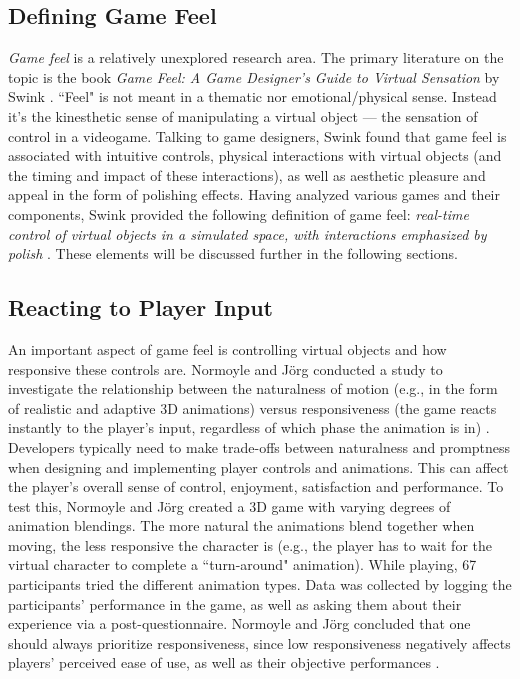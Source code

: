 \subsection{Defining Game Feel}
\textit{Game feel} is a relatively unexplored research area. The primary literature on the topic is the book \textit{Game Feel: A Game Designer's Guide to Virtual Sensation} by Swink \cite{swink}. ``Feel" is not meant in a thematic nor emotional/physical sense. Instead it's the kinesthetic sense of manipulating a virtual object --- the sensation of control in a videogame. Talking to game designers, Swink found that game feel is associated with intuitive controls, physical interactions with virtual objects (and the timing and impact of these interactions), as well as aesthetic pleasure and appeal in the form of polishing effects. Having analyzed various games and their components, Swink provided the following definition of game feel: \textit{real-time control of virtual objects in a simulated space, with interactions emphasized by polish} \cite{swink}. These elements will be discussed further in the following sections.

\subsection{Reacting to Player Input}
An important aspect of game feel is controlling virtual objects and how responsive these controls are. Normoyle and J\"{o}rg conducted a study to investigate the relationship between the naturalness of motion (e.g., in the form of realistic and adaptive 3D animations) versus responsiveness (the game reacts instantly to the player's input, regardless of which phase the animation is in) \cite{normoyle_trade-offs_2014}. Developers typically need to make trade-offs between naturalness and promptness when designing and implementing player controls and animations. This can affect the player's overall sense of control, enjoyment, satisfaction and performance. To test this, Normoyle and J\"{o}rg  created a 3D game with varying degrees of animation blendings. The more natural the animations blend together when moving, the less responsive the character is (e.g., the player has to wait for the virtual character to complete a ``turn-around" animation). While playing, 67 participants tried the different animation types.  Data was collected by logging the participants' performance in the game, as well as asking them about their experience via a post-questionnaire. Normoyle and J\"{o}rg concluded that one should always prioritize responsiveness, since low responsiveness negatively affects players' perceived ease of use, as well as their objective performances \cite{normoyle_trade-offs_2014}.

